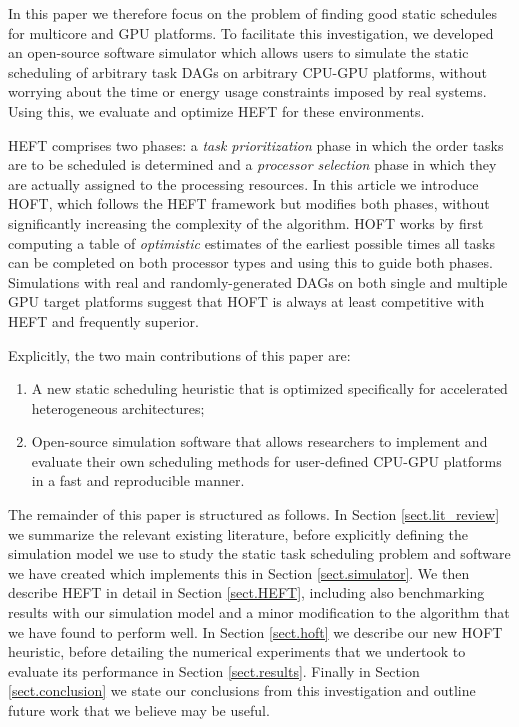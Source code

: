 \documentclass[runningheads]{llncs}
\begin{document}
In this paper we therefore focus on the problem of finding good static schedules for multicore and GPU platforms. To facilitate this investigation, we developed an open-source software simulator which allows users to simulate the static scheduling of arbitrary task DAGs on arbitrary CPU-GPU platforms, without worrying about the time or energy usage constraints imposed by real systems. Using this, we evaluate and optimize HEFT for these environments.  

HEFT comprises two phases: a {\em task prioritization} phase in which the order tasks are to be scheduled is determined and a {\em processor selection} phase in which they are actually assigned to the processing resources. In this article we introduce HOFT, which follows the HEFT framework but modifies both phases, without significantly increasing the complexity of the algorithm. HOFT works by first computing a table of {\em optimistic} estimates of the earliest possible times all tasks can be completed on both processor types and using this to guide both phases. Simulations with real and randomly-generated DAGs on both single and multiple GPU target platforms suggest that HOFT is always at least competitive with HEFT and frequently superior.          

Explicitly, the two main contributions of this paper are:
\begin{enumerate}	
	\item A new static scheduling heuristic that is optimized specifically for accelerated heterogeneous architectures;
	\item Open-source simulation software that allows researchers to implement and evaluate their own scheduling methods for user-defined CPU-GPU platforms in a fast and reproducible manner.
\end{enumerate} 
The remainder of this paper is structured as follows. In Section \ref{sect.lit_review} we summarize the relevant existing literature, before explicitly defining the simulation model we use to study the static task scheduling problem and software we have created which implements this in Section \ref{sect.simulator}. We then describe HEFT in detail in Section \ref{sect.HEFT}, including also benchmarking results with our simulation model and a minor modification to the algorithm that we have found to perform well. In Section \ref{sect.hoft} we describe our new HOFT heuristic, before detailing the numerical experiments that we undertook to evaluate its performance in Section \ref{sect.results}. Finally in Section \ref{sect.conclusion} we state our conclusions from this investigation and outline future work that we believe may be useful.
 
\end{document}
